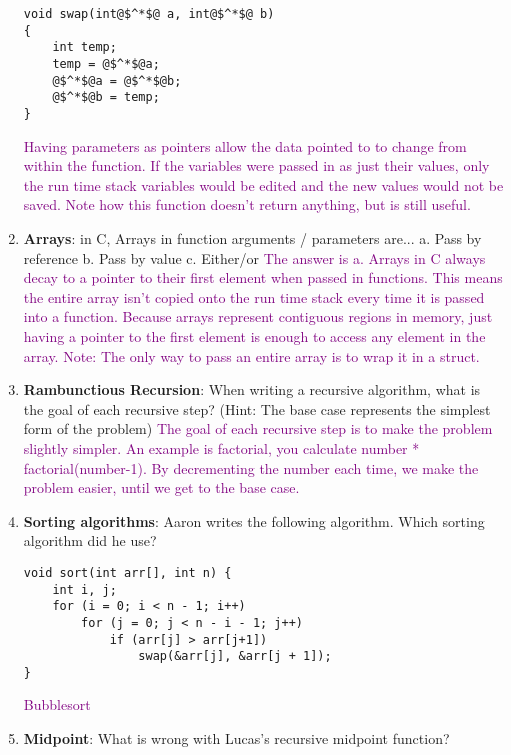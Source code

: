\documentclass{article}
\begin{document}
\begin{enumerate}[label=(\alph*)]
    \begin{lstlisting}[style=CStyle]
void swap(int@$^*$@ a, int@$^*$@ b)
{
    int temp;
    temp = @$^*$@a;
    @$^*$@a = @$^*$@b;
    @$^*$@b = temp;
} \end{lstlisting}
\textcolor{purple}{Having parameters as pointers allow the data pointed to to change from within the function. If the variables were passed in as just their values, only the run time stack variables would be edited and the new values would not be saved. Note how this function doesn't return anything, but is still useful.
    }
\item \textbf{Arrays}: in C, Arrays in function arguments / parameters are...
\newline
a. Pass by reference 
\newline
b. Pass by value
\newline
c. Either/or
\newline
\textcolor{purple}{The answer is a. Arrays in C always decay to a pointer to their first element when passed in functions. This means the entire array isn't copied onto the run time stack every time it is passed into a function. Because arrays represent contiguous regions in memory, just having a pointer to the first element is enough to access any element in the array.
Note: The only way to pass an entire array is to wrap it in a struct.
    }
    \item \textbf{Rambunctious Recursion}: When writing a recursive algorithm, what is the goal of each recursive step? (Hint: The base case represents the simplest form of the problem)
    \newline\textcolor{purple}{The goal of each recursive step is to make the problem slightly simpler. An example is factorial, you calculate number * factorial(number-1). By decrementing the number each time, we make the problem easier, until we get to the base case.
    }
    \item \textbf{Sorting algorithms}: Aaron writes the following algorithm. Which sorting algorithm did he use?
\begin{lstlisting}[style=CStyle]
void sort(int arr[], int n) {
    int i, j;
    for (i = 0; i < n - 1; i++)
        for (j = 0; j < n - i - 1; j++)
            if (arr[j] > arr[j+1])
                swap(&arr[j], &arr[j + 1]);
}\end{lstlisting}
 \newline\textcolor{purple}{Bubblesort}
 
        \item \textbf{Midpoint}: What is wrong with Lucas's  recursive midpoint function?
     

\end{enumerate}
\end{document}

